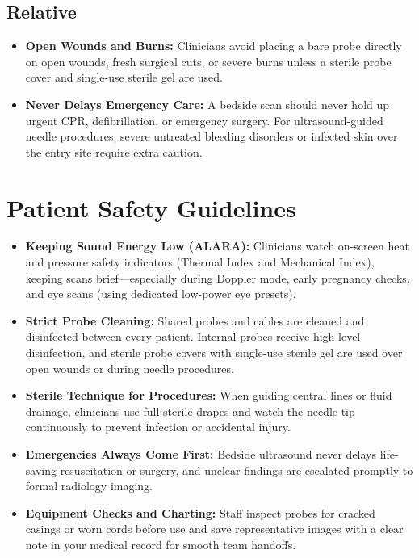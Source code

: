 \subsection{Relative}

\begin{itemize}
    \item \textbf{Open Wounds and Burns:} Clinicians avoid placing a bare probe directly on open wounds, fresh surgical cuts, or severe burns unless a sterile probe cover and single-use sterile gel are used.
    \item \textbf{Never Delays Emergency Care:} A bedside scan should never hold up urgent CPR, defibrillation, or emergency surgery. For ultrasound-guided needle procedures, severe untreated bleeding disorders or infected skin over the entry site require extra caution.
\end{itemize}

\section{Patient Safety Guidelines}

\begin{itemize}
    \item \textbf{Keeping Sound Energy Low (ALARA):} Clinicians watch on-screen heat and pressure safety indicators (Thermal Index and Mechanical Index), keeping scans brief---especially during Doppler mode, early pregnancy checks, and eye scans (using dedicated low-power eye presets).
    \item \textbf{Strict Probe Cleaning:} Shared probes and cables are cleaned and disinfected between every patient. Internal probes receive high-level disinfection, and sterile probe covers with single-use sterile gel are used over open wounds or during needle procedures.
    \item \textbf{Sterile Technique for Procedures:} When guiding central lines or fluid drainage, clinicians use full sterile drapes and watch the needle tip continuously to prevent infection or accidental injury.
    \item \textbf{Emergencies Always Come First:} Bedside ultrasound never delays life-saving resuscitation or surgery, and unclear findings are escalated promptly to formal radiology imaging.
    \item \textbf{Equipment Checks and Charting:} Staff inspect probes for cracked casings or worn cords before use and save representative images with a clear note in your medical record for smooth team handoffs.
\end{itemize}


